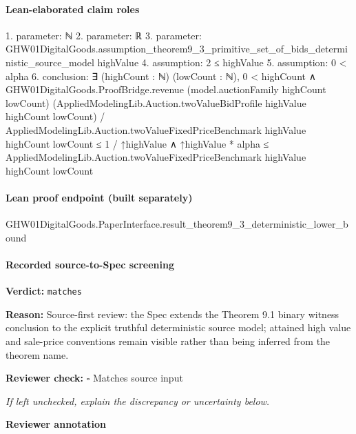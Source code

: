 \documentclass[10pt]{article}
\newcommand{\reviewerbox}{%
  \par\noindent\fbox{\parbox{0.96\linewidth}{\rule{0pt}{0.38in}}}\par
}
\newcommand{\reviewmatch}[1]{%
  \par\noindent\textbf{Reviewer check:} $\square$\; #1\par
  \noindent\emph{If left unchecked, explain the discrepancy or uncertainty below.}\par
}
\begin{document}
\paragraph{Lean-elaborated claim roles}\begin{ReviewVerbatim}
1. parameter: ℕ
2. parameter: ℝ
3. parameter: GHW01DigitalGoods.assumption_theorem9_3_primitive_set_of_bids_deterministic_source_model highValue
4. assumption: 2 ≤ highValue
5. assumption: 0 < alpha
6. conclusion: ∃ (highCount : ℕ) (lowCount : ℕ),
  0 < highCount ∧
    GHW01DigitalGoods.ProofBridge.revenue (model.auctionFamily highCount lowCount)
            (AppliedModelingLib.Auction.twoValueBidProfile highValue highCount lowCount) /
          AppliedModelingLib.Auction.twoValueFixedPriceBenchmark highValue highCount lowCount ≤
        1 / ↑highValue ∧
      ↑highValue * alpha ≤ AppliedModelingLib.Auction.twoValueFixedPriceBenchmark highValue highCount lowCount
\end{ReviewVerbatim}

\paragraph{Lean proof endpoint (built separately)}\begin{ReviewVerbatim}
GHW01DigitalGoods.PaperInterface.result_theorem9_3_deterministic_lower_bound
\end{ReviewVerbatim}

\paragraph{Recorded source-to-Spec screening}
\textbf{Verdict:} \texttt{matches}
\\
{\raggedright
\textbf{Reason:} Source-\allowbreak{}first review:\allowbreak{} the Spec extends the Theorem 9.\allowbreak{}1 binary witness conclusion to the explicit truthful deterministic source model;\allowbreak{} attained high value and sale-\allowbreak{}price conventions remain visible rather than being inferred from the theorem name.\allowbreak{}
\par}
\reviewmatch{Matches source input}
\noindent\textbf{Reviewer annotation}\par
\reviewerbox
\end{document}
